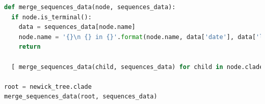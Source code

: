 \documentclass[11pt,italian]{article}
\begin{document}
\begin{lstlisting}[caption=Funzione per l'inserimento dei dati nelle foglie dell'albero,label=code:merge_sequence_data_function,language=Python]
def merge_sequences_data(node, sequences_data):
  if node.is_terminal():
    data = sequences_data[node.name]
    node.name = '{}\n {} in {}'.format(node.name, data['date'], data['location'])
    return

  [ merge_sequences_data(child, sequences_data) for child in node.clades ]

root = newick_tree.clade
merge_sequences_data(root, sequences_data)
\end{lstlisting}
\end{document}
